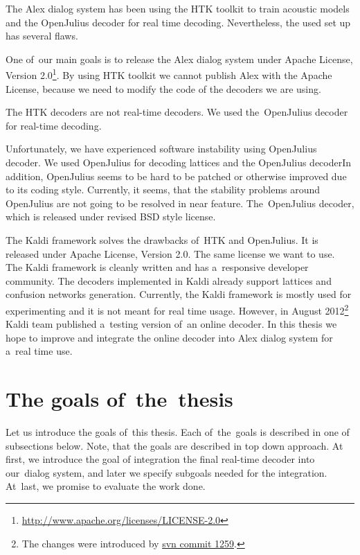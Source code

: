 The Alex dialog system has been using the \ac{HTK} toolkit\cite{young94htk} to train acoustic models and the OpenJulius\cite{lee2009julius} decoder for real time decoding. Nevertheless, the used set up has several flaws.


One of~our main goals is to release the Alex dialog system under Apache License, Version 2.0\footnote{\url{http://www.apache.org/licenses/LICENSE-2.0}}. By using \ac{HTK} toolkit we cannot publish Alex with the Apache License, because we need to modify the code of the decoders we are using. 

The \ac{HTK} decoders are not real-time decoders\cite{yao2010practical}. We used the~OpenJulius decoder for real-time decoding.

Unfortunately, we have experienced software instability using OpenJulius decoder. We used OpenJulius for decoding lattices and the OpenJulius decoderIn addition, OpenJulius seems to be hard to be patched or otherwise improved due to its coding style. Currently, it seems, that the stability problems around OpenJulius are not going to be resolved in near feature.
The~OpenJulius decoder, which is released under revised BSD style license.

The Kaldi\cite{povey2011kaldi} framework solves the drawbacks of~\ac{HTK} and OpenJulius. It is released under Apache License, Version 2.0. The same license we want to use. The Kaldi framework is cleanly written and has a~responsive developer community. The decoders implemented in Kaldi already support lattices and confusion networks generation. Currently, the Kaldi framework is mostly used for experimenting and it is not meant for real time usage. However, in August 2012\footnote{The changes were introduced by \href{https://sourceforge.net/p/kaldi/code/1259/}{svn commit 1259}.} Kaldi team published a~testing version of~an online decoder. In this thesis we hope to improve and integrate the online decoder into Alex dialog system for a~real time use.


\section{The goals of~the~thesis} 
\label{sec:goals}
Let us introduce the goals of~this thesis. Each of~the~goals is described in one of subsections below. Note, that the goals are described in top down approach.
At first, we introduce the goal of integration the final real-time decoder into our~dialog system, and later we specify subgoals needed for the integration.
At~last, we promise to evaluate the work done.


